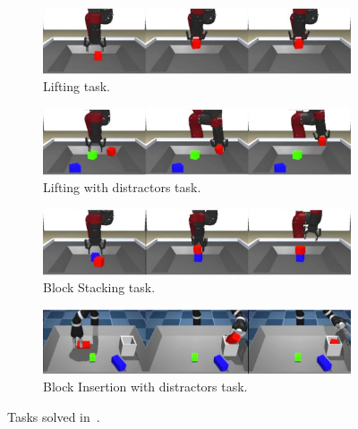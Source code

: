 \begin{figure}[t]
    \centering
    \begin{subfigure}[b]{0.6\textwidth}
        \centering
        \includegraphics[width=\textwidth]{figures/images/trail/block_lifting.jpg}
        \caption{Lifting task.}
    \end{subfigure}
    \vfill
    \begin{subfigure}[b]{0.6\textwidth}
        \includegraphics[width=\textwidth]{figures/images/trail/block_lifting_with_distractors}
        \caption{Lifting with distractors task.}
    \end{subfigure}
    \vfill
    \begin{subfigure}[b]{0.6\textwidth}
        \includegraphics[width=\textwidth]{figures/images/trail/block_stacking}
        \caption{Block Stacking task.}
    \end{subfigure}
    \vfill
    \begin{subfigure}[b]{0.6\textwidth}
        \includegraphics[width=\textwidth]{figures/images/trail/block_insertion_with_distractors}
        \caption{Block Insertion with distractors task.}
    \end{subfigure}
    \caption{Tasks solved in~\cite{zolna2021task_relevant_ail}.}
    \label{fig:trail_tasks}
\end{figure}
